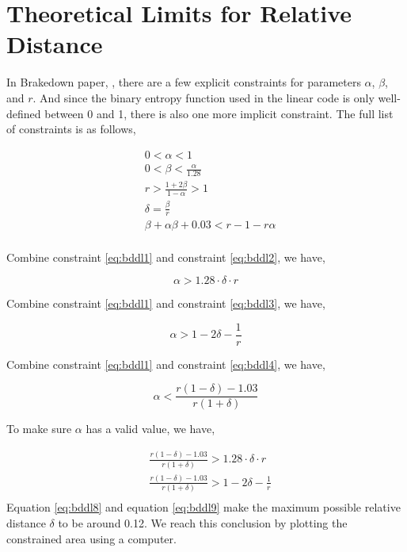 \section{Theoretical Limits for Relative Distance}

In Brakedown paper, \cite{brakedown}, there are a few explicit constraints for parameters $\alpha$, $\beta$, and $r$. And since the binary entropy function used in the linear code is only well-defined between 0 and 1, there is also one more implicit constraint. The full list of constraints is as follows,

\begin{align}
& 0 < \alpha < 1 \nonumber \\
& 0 < \beta < \frac{\alpha}{1.28} \label{eq:bddl2} \\
& r > \frac{1 + 2\beta}{1 - \alpha} > 1 \label{eq:bddl3} \\
& \delta = \frac{\beta}{r} \label{eq:bddl1} \\
& \beta + \alpha\beta + 0.03 < r - 1 - r\alpha \label{eq:bddl4} \\
\end{align}

Combine constraint \ref{eq:bddl1} and constraint \ref{eq:bddl2}, we have,

\begin{equation}
\label{eq:bddl5}
    \alpha > 1.28 \cdot \delta \cdot r 
\end{equation}
    

Combine constraint \ref{eq:bddl1} and constraint \ref{eq:bddl3}, we have,

\begin{equation}
\label{eq:bddl6}
    \alpha > 1 - 2\delta - \frac{1}{r} 
\end{equation}


Combine constraint \ref{eq:bddl1} and constraint \ref{eq:bddl4}, we have,

\begin{equation}
\label{eq:bddl7}
    \alpha < \frac{r(1 - \delta) - 1.03}{r(1 + \delta)}
\end{equation}

To make sure $\alpha$ has a valid value, we have,

\begin{align}
& \frac{r(1 - \delta) - 1.03}{r(1 + \delta)} > 1.28 \cdot \delta \cdot r \label{eq:bddl8} \\
& \frac{r(1 - \delta) - 1.03}{r(1 + \delta)} > 1 - 2\delta - \frac{1}{r}  \label{eq:bddl9} \\
\end{align}
Equation \ref{eq:bddl8} and equation \ref{eq:bddl9} make the maximum possible relative distance $\delta$ to be around 0.12. We reach this conclusion by plotting the constrained area using a computer.